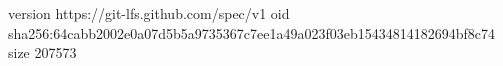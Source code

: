version https://git-lfs.github.com/spec/v1
oid sha256:64cabb2002e0a07d5b5a9735367c7ee1a49a023f03eb15434814182694bf8c74
size 207573

